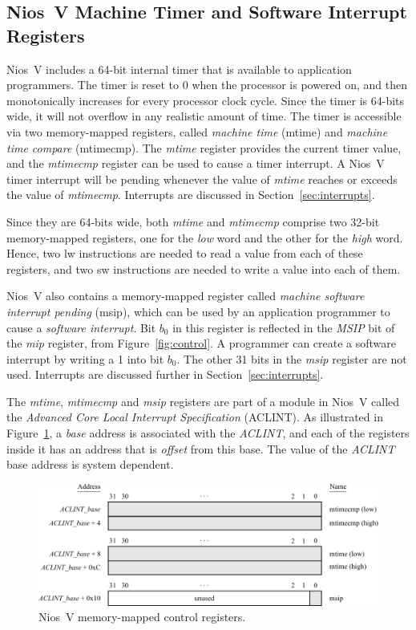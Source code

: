 \documentclass[11pt, twoside, pdftex]{article}
\begin{document}
\subsection{Nios~V Machine Timer and Software Interrupt Registers}
\label{sec:timer}
Nios~V includes a 64-bit internal timer that is available to application programmers. 
The timer is reset to 0 when the processor is powered on, and then monotonically
increases for every processor clock cycle. 
Since the timer is 64-bits wide, it will not overflow in any realistic amount
of time. The timer is accessible via two memory-mapped registers, called {\it machine
time} (mtime) and {\it machine time compare} (mtimecmp). The {\it mtime} register provides 
the current timer value, and the {\it mtimecmp} register can be used to cause a timer 
interrupt. A Nios~V timer interrupt will be pending whenever the value of {\it mtime} reaches or
exceeds the value of {\it mtimecmp}. Interrupts are discussed in Section~\ref{sec:interrupts}.

Since they are 64-bits wide, both {\it mtime} and {\it mtimecmp} comprise two 32-bit 
memory-mapped registers, one for the {\it low} word and the other for the {\it high} word. 
Hence, two {\sf lw} instructions are needed to read a value from each of these registers, and 
two {\sf sw} instructions are needed to write a value into each of them.

Nios~V also contains a memory-mapped register called {\it machine software interrupt
pending} (msip), which can be used by an application programmer to cause a 
{\it software interrupt}. Bit $b_0$ in this register is reflected in the {\it MSIP} bit of 
the {\it mip} register, from Figure~\ref{fig:control}. A programmer can create a software 
interrupt by writing a 1 into bit $b_0$. The other 31 bits in the {\it msip} register are not
used. Interrupts are discussed further in Section~\ref{sec:interrupts}.

The {\it mtime}, {\it mtimecmp} and {\it msip} registers are part of a module in Nios~V called
the {\it Advanced Core Local Interrupt Specification} (ACLINT). As illustrated in 
Figure~\ref{fig:mm_control}, a {\it base} address is associated with the {\it ACLINT}, and 
each of the registers inside it has an address that is {\it offset} from this base. The value of
the {\it ACLINT} base address is system dependent. 

\begin{figure}[h]
   \begin{center}
      \includegraphics[scale=.9]{figures/mm_control_registers.pdf}
   \caption{Nios~V memory-mapped control registers.} 
	 \label{fig:mm_control}
	 \end{center}
\end{figure}
\end{document}
